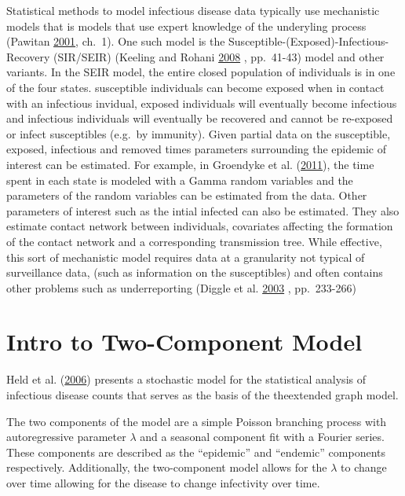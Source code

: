 \documentclass[11pt,a4paper]{article}
\numberwithin{equation}{section}
\begin{document}
Statistical methods to model infectious disease data typically use
mechanistic models that is models that use expert knowledge of the
underyling process (Pawitan
\protect\hyperlink{ref-pawitan_all_2001}{2001}, ch.~1). One such model
is the Susceptible-(Exposed)-Infectious-Recovery (SIR/SEIR) (Keeling and
Rohani \protect\hyperlink{ref-keeling_modeling_2008}{2008} , pp.~41-43)
model and other variants. In the SEIR model, the entire closed
population of individuals is in one of the four states. susceptible
individuals can become exposed when in contact with an infectious
invidual, exposed individuals will eventually become infectious and
infectious individuals will eventually be recovered and cannot be
re-exposed or infect susceptibles (e.g.~by immunity). Given partial data
on the susceptible, exposed, infectious and removed times parameters
surrounding the epidemic of interest can be estimated. For example, in
Groendyke et al.
(\protect\hyperlink{ref-groendyke_bayesian_2011}{2011}), the time spent
in each state is modeled with a Gamma random variables and the
parameters of the random variables can be estimated from the data. Other
parameters of interest such as the intial infected can also be
estimated. They also estimate contact network between individuals,
covariates affecting the formation of the contact network and a
corresponding transmission tree. While effective, this sort of
mechanistic model requires data at a granularity not typical of
surveillance data, (such as information on the susceptibles) and often
contains other problems such as underreporting (Diggle et al.
\protect\hyperlink{ref-diggle_-line_2003}{2003} , pp.~233-266)

\hypertarget{intro-to-two-component-model}{%
\section{Intro to Two-Component
Model}\label{intro-to-two-component-model}}

Held et al. (\protect\hyperlink{ref-held_two-component_2006}{2006})
presents a stochastic model for the statistical analysis of infectious
disease counts that serves as the basis of the theextended graph model.

The two components of the model are a simple Poisson branching process
with autoregressive parameter \(\lambda\) and a seasonal component fit
with a Fourier series. These components are described as the
``epidemic'' and ``endemic'' components respectively. Additionally, the
two-component model allows for the \(\lambda\) to change over time
allowing for the disease to change infectivity over time.
\end{document}
